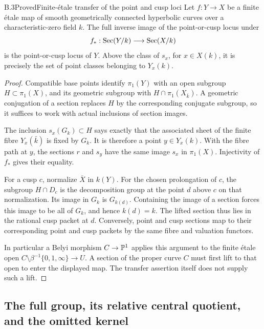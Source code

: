 \begin{statement}{B.3}{Proved}{Finite-\'etale transfer of the point and cusp loci}
Let $f:Y\to X$ be a finite \'etale map of smooth geometrically connected
hyperbolic curves over a characteristic-zero field $k$.  The full
inverse image of the point-or-cusp locus under
\[
 f_*:\operatorname{Sec}(Y/k)\longrightarrow\operatorname{Sec}(X/k)
\]
is the point-or-cusp locus of $Y$.  Above the class of $s_x$, for
$x\in X(k)$, it is precisely the set of point classes belonging to
$Y_x(k)$.
\end{statement}
\begin{proof}
Compatible base points identify $\pi_1(Y)$ with an open subgroup
$H\subset\pi_1(X)$, and its geometric subgroup with
$H\cap\pi_1(X_{\bar k})$.  A geometric conjugation of a section
replaces $H$ by the corresponding conjugate subgroup, so it suffices
to work with actual inclusions of section images.

The inclusion $s_x(G_k)\subset H$ says exactly that the associated
sheet of the finite fibre $Y_x(\bar k)$ is fixed by $G_k$.  It is
therefore a point $y\in Y_x(k)$.  With the fibre path at $y$, the
sections $r$ and $s_y$ have the same image $s_x$ in $\pi_1(X)$.
Injectivity of $f_*$ gives their equality.

For a cusp $c$, normalize $\overline X$ in $k(Y)$.  For the chosen
prolongation of $c$, the subgroup $H\cap D_c$ is the decomposition
group at the point $d$ above $c$ on that normalization.  Its image
in $G_k$ is $G_{k(d)}$.  Containing the image of a section forces
this image to be all of $G_k$, and hence $k(d)=k$.  The lifted
section thus lies in the rational cusp packet at $d$.  Conversely,
point and cusp sections map to their corresponding point and cusp
packets by the same fibre and valuation functors.

In particular a Belyi morphism $C\to\mathbb P^1$ applies this argument to
the finite \'etale open $C\setminus\beta^{-1}\{0,1,\infty\}\to U$.
A section of the proper curve $C$ must first lift to that open to
enter the displayed map.  The transfer assertion itself does not
supply such a lift.
\end{proof}

\subsection{The full group, its relative central quotient, and the omitted kernel}

